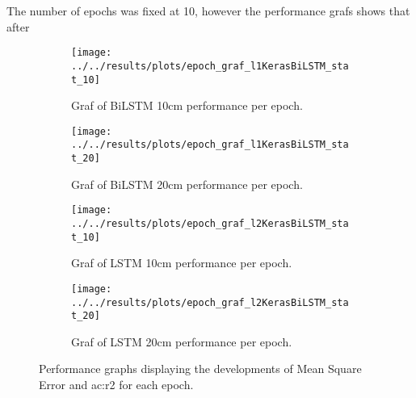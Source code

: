 The number of epochs was fixed at 10, however the performance grafs shows that after 
\begin{figure}
	\begin{subfigure}{0.45\textwidth}
		\centering
		\texttt{[image: ../../results/plots/epoch\_graf\_l1KerasBiLSTM\_stat\_10]}
		\caption[Epoch graph BiLSTM 10cm]{Graf of BiLSTM 10cm performance per epoch.}
		\label{fig:epochgrafl1kerasbilstmstat10}
	\end{subfigure}
	\begin{subfigure}{0.45\textwidth}
		\centering
		\texttt{[image: ../../results/plots/epoch\_graf\_l1KerasBiLSTM\_stat\_20]}
		\caption[Epoch graph BiLSTM 20cm]{Graf of BiLSTM 20cm performance per epoch.}
		\label{fig:epochgrafl1kerasbilstmstat20}
	\end{subfigure}
	\begin{subfigure}{0.45\textwidth}
		\centering
		\texttt{[image: ../../results/plots/epoch\_graf\_l2KerasBiLSTM\_stat\_10]}
		\caption[Epoch graph LSTM 10cm]{Graf of LSTM 10cm performance per epoch.}
		\label{fig:epochgrafl2kerasbilstmstat10}
	\end{subfigure}
	\begin{subfigure}{0.45\textwidth}
		\centering
		\texttt{[image: ../../results/plots/epoch\_graf\_l2KerasBiLSTM\_stat\_20]}
		\caption[Epoch graph LSTM 20cm]{Graf of LSTM 20cm performance per epoch.}
		\label{fig:epochgrafl2kerasbilstmstat20}
	\end{subfigure}
	\caption{Performance graphs displaying the developments of Mean Square Error and \acrfull{ac:r2} for each epoch.}
\end{figure}
